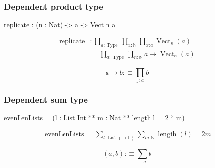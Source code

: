 \documentclass[
xcolor={usenames,dvipsnames,svgnames},
]{beamer}
\DeclareMathOperator{\Vect}{Vect}
\DeclareMathOperator{\Type}{Type}
\DeclareMathOperator{\List}{List}
\DeclareMathOperator{\Int}{Int}
\newcommand{\N}{\ensuremath{\mathbb{N}}}
\begin{document}

  \begin{frame}[fragile]
    \frametitle{Dependent product type}

    \begin{center}

    \begin{code}
          replicate : (n : Nat) -> a -> Vect n a
    \end{code}

    \begin{align*}
      \operatorname{replicate} &: \prod_{a : \Type} \prod_{n : \mathbb{N}} \prod_{x : a} \Vect_n(a) \\
      &=  \prod_{a : \Type} \prod_{n : \mathbb{N}} a \to \Vect_n(a)
    \end{align*}

      \[
        a \to b :\equiv \prod_{\_\, : a} b
      \]

    \end{center}
  \end{frame}

  \begin{frame}[fragile]
    \frametitle{Dependent sum type}

    \begin{center}

    \begin{code}
evenLenLists = (l : List Int ** m : Nat ** length l = 2 * m)
    \end{code}

      \begin{align*}
        \operatorname{evenLenLists} = \sum_{l : \List(\Int)} \sum_{m:\N} \operatorname{length}(l) = 2m
      \end{align*}

      \[
        (a, b) :\equiv \sum_{\_ \,: a} b
      \]

    \end{center}
  \end{frame}
\end{document}
